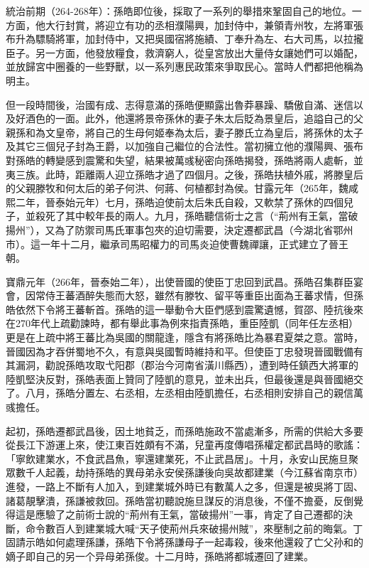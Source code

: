 統治前期（264-268年）：孫皓即位後，採取了一系列的舉措來鞏固自己的地位。一方面，他大行封賞，將迎立有功的丞相濮陽興，加封侍中，兼領青州牧，左將軍張布升為驃騎將軍，加封侍中，又把吳國宿將施績、丁奉升為左、右大司馬，以拉攏臣子。另一方面，他發放糧食，救濟窮人，從皇宮放出大量侍女讓她們可以婚配，並放歸宮中圈養的一些野獸，以一系列惠民政策來爭取民心。當時人們都把他稱為明主。

但一段時間後，治國有成、志得意滿的孫皓便顯露出魯莽暴躁、驕傲自滿、迷信以及好酒色的一面。此外，他還將景帝孫休的妻子朱太后貶為景皇后，追謚自己的父親孫和為文皇帝，將自己的生母何姬奉為太后，妻子滕氏立為皇后，將孫休的太子及其它三個兒子封為王爵，以加強自己繼位的合法性。當初擁立他的濮陽興、張布對孫皓的轉變感到震驚和失望，結果被萬彧秘密向孫皓揭發，孫皓將兩人處斬，並夷三族。此時，距離兩人迎立孫皓才過了四個月。之後，孫皓扶植外戚，將滕皇后的父親滕牧和何太后的弟子何洪、何蔣、何植都封為侯。甘露元年（265年，魏咸熙二年，晉泰始元年）七月，孫皓迫使前太后朱氏自殺，又軟禁了孫休的四個兒子，並殺死了其中較年長的兩人。九月，孫皓聽信術士之言（“荊州有王氣，當破揚州”），又為了防禦司馬氏軍事包夾的迫切需要，決定遷都武昌（今湖北省鄂州市）。這一年十二月，繼承司馬昭權力的司馬炎迫使曹魏禪讓，正式建立了晉王朝。

寶鼎元年（266年，晉泰始二年），出使晉國的使臣丁忠回到武昌。孫皓召集群臣宴會，因常侍王蕃酒醉失態而大怒，雖然有滕牧、留平等重臣出面為王蕃求情，但孫皓依然下令將王蕃斬首。孫皓的這一舉動令大臣們感到震驚遺憾，賀邵、陸抗後來在270年代上疏勸諫時，都有舉此事為例來指責孫皓，重臣陸凱（同年任左丞相）更是在上疏中將王蕃比為吳國的關龍逢，隱含有將孫皓比為暴君夏桀之意。當時，晉國因為才吞併蜀地不久，有意與吳國暫時維持和平。但使臣丁忠發現晉國戰備有其漏洞，勸說孫皓攻取弋阳郡（郡治今河南省潢川縣西），遭到時任鎮西大將軍的陸凱堅決反對，孫皓表面上贊同了陸凱的意見，並未出兵，但最後還是與晉國絕交了。八月，孫皓分置左、右丞相，左丞相由陸凱擔任，右丞相則安排自己的親信萬彧擔任。

起初，孫皓遷都武昌後，因土地貧乏，而孫皓施政不當處漸多，所需的供給大多要從長江下游運上來，使江東百姓頗有不滿，兒童再度傳唱孫權定都武昌時的歌謠：「寧飲建業水，不食武昌魚，寧還建業死，不止武昌居」。十月，永安山民施旦聚眾數千人起義，劫持孫皓的異母弟永安侯孫謙後向吳故都建業（今江蘇省南京市）進發，一路上不斷有人加入，到建業城外時已有數萬人之多，但還是被吳將丁固、諸葛靚擊潰，孫謙被救回。孫皓當初聽說施旦謀反的消息後，不僅不擔憂，反倒覺得這是應驗了之前術士說的“荊州有王氣，當破揚州”一事，肯定了自己遷都的決斷，命令數百人到建業城大喊“天子使荊州兵來破揚州賊”，來壓制之前的晦氣。丁固請示皓如何處理孫謙，孫皓下令將孫謙母子一起毒殺，後來他還殺了亡父孙和的嫡子即自己的另一个异母弟孫俊。十二月時，孫皓將都城遷回了建業。

